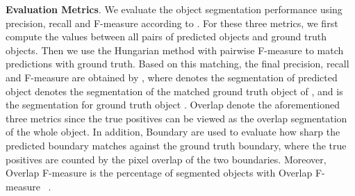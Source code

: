 \documentclass[letterpaper, 10 pt, conference]{ieeeconf}
\begin{document}
 
\textbf{Evaluation Metrics}. We evaluate the object segmentation performance using precision, recall and F-measure according to \cite{xie2020best, xiang2020learning}. For these three metrics, we first compute the values between all pairs of predicted objects and ground truth objects. Then we use the Hungarian method with pairwise F-measure to match predictions with ground truth. Based on this matching, the final precision, recall and F-measure are obtained by , where  denotes the segmentation of predicted object  denotes the segmentation of the matched ground truth object of , and  is the segmentation for ground truth object . Overlap  denote the aforementioned three metrics since the true positives can be viewed as the overlap segmentation of the whole object. In addition, Boundary  are used to evaluate how sharp the predicted boundary matches against the ground truth boundary, where the true positives are counted by the pixel overlap of the two boundaries. Moreover, Overlap F-measure  is the percentage of segmented objects with Overlap F-measure ~\cite{ochs2013segmentation}. 
\end{document}
